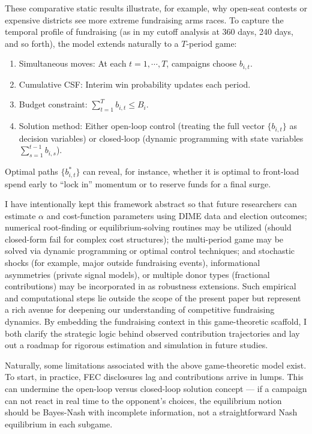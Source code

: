 These comparative static results illustrate, for example, why open-seat contests or expensive districts see more extreme fundraising arms races. To capture the temporal profile of fundraising (as in my cutoff analysis at 360 days, 240 days, and so forth), the model extends naturally to a $T$-period game:

\begin{enumerate}
	\item Simultaneous moves: At each $t = 1, \cdots, T$, campaigns choose $b_{i,t}$.
	\item Cumulative CSF: Interim win probability updates each period.
	\item Budget constraint: $\sum\limits_{t=1}^T b_{i,t} \leq B_i$.
	\item Solution method: Either open-loop control (treating the full vector $\{b_{i,t} \}$ as decision variables) or closed-loop (dynamic programming with state variables $\sum\limits_{s=1}^{t-1} b_{i,s}$).
\end{enumerate}

Optimal paths $\{b_{i,t}^* \}$ can reveal, for instance, whether it is optimal to front-load spend early to ``lock in'' momentum or to reserve funds for a final surge.

I have intentionally kept this framework abstract so that future researchers can estimate $\alpha$ and cost-function parameters using DIME data and election outcomes; numerical root-finding or equilibrium-solving routines may be utilized (should closed-form fail for complex cost structures); the multi-period game may be solved via dynamic programming or optimal control techniques; and stochastic shocks (for example, major outside fundraising events), informational asymmetries (private signal models), or multiple donor types (fractional contributions) may be incorporated in as robustness extensions. Such empirical and computational steps lie outside the scope of the present paper but represent a rich avenue for deepening our understanding of competitive fundraising dynamics. By embedding the fundraising context in this game-theoretic scaffold, I both clarify the strategic logic behind observed contribution trajectories and lay out a roadmap for rigorous estimation and simulation in future studies.

Naturally, some limitations associated with the above game-theoretic model exist. To start, in practice, FEC disclosures lag and contributions arrive in lumps. This can undermine the open-loop versus closed-loop solution concept --- if a campaign can not react in real time to the opponent's choices, the equilibrium notion should be Bayes-Nash with incomplete information, not a straightforward Nash equilibrium in each subgame.

